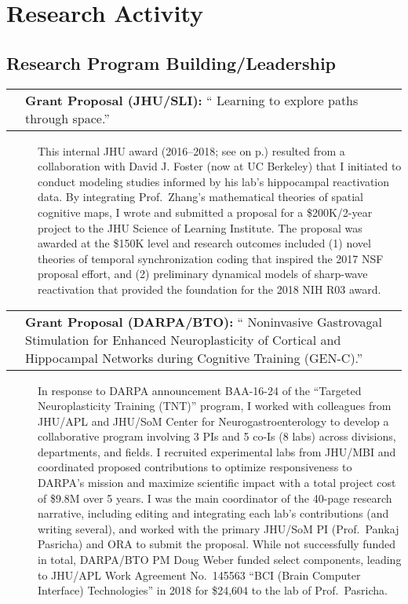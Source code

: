 \documentclass[10pt]{article}
\makeatletter
\newcommand{\unpubtitle}[1]{{\color{hopkinsblue} #1}}
\newcommand{\researchnote}[1]{
  \begin{description}
    \item[] {\hspace{2.2ex}\color{darkgray} #1}
  \end{description}
}
\newcommand{\researchactivity}[4]{
  \begin{minipage}[t]{\textwidth}
    \begin{tabular}{@{\hspace{2ex}}l>{\raggedright\arraybackslash}p{.8\textwidth}}
      \makebox[1.2in][l]{#1} & \textbf{#2:}
      ``\unpubtitle{#3}.'' 
    \end{tabular}
  \researchnote{\hspace{1ex} #4}
  \end{minipage}
  \medbreak
}
\makeatother
\begin{document}
\section*{Research Activity}

\subsection*{Research Program Building/Leadership}
\label{sec:resprogram}

\researchactivity
{Mar. 2016--2018}
{Grant Proposal (JHU/SLI)}
{Learning to explore paths through space}
{This internal JHU award (2016--2018; see \emph{\nameref{sec:prevsupport}} on
  p.\pageref{sec:prevsupport}) resulted from a collaboration with David J. Foster
  (now at UC Berkeley) that I initiated to conduct modeling studies informed
  by his lab’s hippocampal reactivation data. By integrating Prof.~Zhang’s
  mathematical theories of spatial cognitive maps, I wrote and submitted a
  proposal for a \$200K/2-year project to the JHU Science of Learning Institute.
  The proposal was awarded at the \$150K level and research outcomes included (1)
  novel theories of temporal synchronization coding that inspired the 2017 NSF
  proposal effort, and (2) preliminary dynamical models of sharp-wave reactivation
that provided the foundation for the 2018 NIH R03 award.}
\label{sec:ressli}

\researchactivity
{April--June 2016}
{Grant Proposal (DARPA/BTO)}
{Noninvasive Gastrovagal Stimulation for Enhanced Neuroplasticity of Cortical
and Hippocampal Networks during Cognitive Training (GEN-C)}
{In response to DARPA announcement BAA-16-24 of the “Targeted Neuroplasticity
  Training (TNT)” program, I worked with colleagues from JHU/APL and JHU/SoM
  Center for Neurogastroenterology to develop a collaborative program involving 3
  PIs and 5 co-Is (8 labs) across divisions, departments, and fields. I recruited
  experimental labs from JHU/MBI and coordinated proposed contributions to
  optimize responsiveness to DARPA’s mission and maximize scientific impact with
  a total project cost of \$9.8M over 5 years. I was the main coordinator of
  the 40-page research narrative, including editing and integrating each lab’s
  contributions (and writing several), and worked with the primary JHU/SoM PI
  (Prof.~Pankaj Pasricha) and ORA to submit the proposal. While not successfully
  funded in total, DARPA/BTO PM Doug Weber funded select components, leading to
  JHU/APL Work Agreement No.~145563 “BCI (Brain Computer Interface) Technologies”
in 2018 for \$24,604 to the lab of Prof.~Pasricha.}
\end{document}
